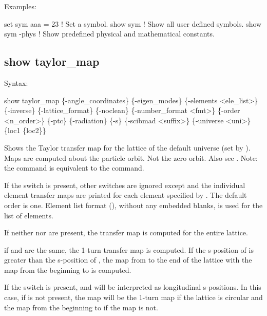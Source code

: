 {{{{{{{{{{{Examples:
\begin{example}
  set sym aaa = 23  ! Set a symbol.
  show sym          ! Show all user defined symbols.
  show sym -phys    ! Show predefined physical and mathematical constants.
\end{example}


\subsection{show taylor_map}
\label{s:show.taylor}

Syntax:
\begin{example}
  show taylor_map \{-angle_coordinates\} \{-eigen_modes\} \{-elements <ele_list>\} 
                \{-inverse\} \{-lattice_format\} \{-noclean\} \{-number_format <fmt>\} 
                \{-order <n_order>\} \{-ptc\} \{-radiation\} \{-s\} 
                \{-scibmad <suffix>\} \{-universe <uni>\} \{loc1 \{loc2\}\}
\end{example}

Shows the Taylor transfer map for the  lattice of the default universe (set by ). Maps are computed about the particle orbit. Not the
zero orbit. Also see . Note: the  command is equivalent to the
 command.

If the  switch is present, other switches are ignored except  and the
individual element transfer maps are printed for each element specified by . The
default order is one. Element list format (), without any embedded blanks,
is used for the  list of elements.

If neither  nor  are present, the transfer map is computed for the
entire lattice.

if  and  are the same, the 1-turn transfer map is computed. If the
s-position of  is greater than the s-position of , the map from
 to the end of the lattice with the map from the beginning to  is
computed.

If the  switch is present,  and  will be interpreted as longitudinal
s-positions. In this case, if  is not present, the map will be the 1-turn map if the
lattice is circular and the map from the beginning to  if the map is not.

}}}}}}}}}}}
